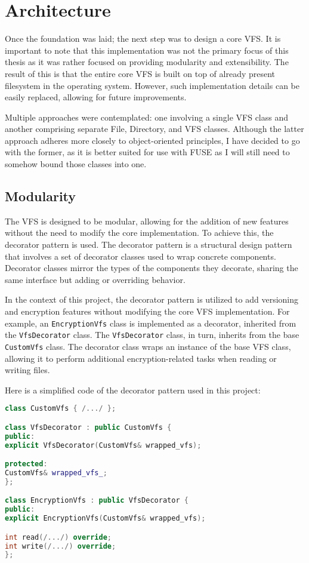 \section{Architecture}\label{sec:architecture}

Once the foundation was laid; the next step was to design a core VFS\@.
It is important to note that this implementation was not the primary focus of this thesis as it was rather focused on providing modularity and extensibility.
The result of this is that the entire core VFS is built on top of already present filesystem in the operating system.
However, such implementation details can be easily replaced, allowing for future improvements.

Multiple approaches were contemplated: one involving a single VFS class and another comprising separate File, Directory, and VFS classes.
Although the latter approach adheres more closely to object-oriented principles, I have decided to go with the former, as it is better suited for use with FUSE as I will still need to somehow bound those classes into one.

\subsection{Modularity}\label{subsec:modularity}

The VFS is designed to be modular, allowing for the addition of new features without the need to modify the core implementation.
To achieve this, the decorator pattern is used.
The decorator pattern is a structural design pattern that involves a set of decorator classes used to wrap concrete components.
Decorator classes mirror the types of the components they decorate, sharing the same interface but adding or overriding behavior.

In the context of this project, the decorator pattern is utilized to add versioning and encryption features without modifying the core VFS implementation.
For example, an \texttt{EncryptionVfs} class is implemented as a decorator, inherited from the \texttt{VfsDecorator} class.
The \texttt{VfsDecorator} class, in turn, inherits from the base \texttt{CustomVfs} class.
The decorator class wraps an instance of the base VFS class, allowing it to perform additional encryption-related tasks when reading or writing files.

Here is a simplified code of the decorator pattern used in this project:

\begin{lstlisting}[language=c++, basicstyle=\ttfamily\small]
class CustomVfs { /.../ };

class VfsDecorator : public CustomVfs {
public:
explicit VfsDecorator(CustomVfs& wrapped_vfs);

protected:
CustomVfs& wrapped_vfs_;
};

class EncryptionVfs : public VfsDecorator {
public:
explicit EncryptionVfs(CustomVfs& wrapped_vfs);

int read(/.../) override;
int write(/.../) override;
};
\end{lstlisting}

